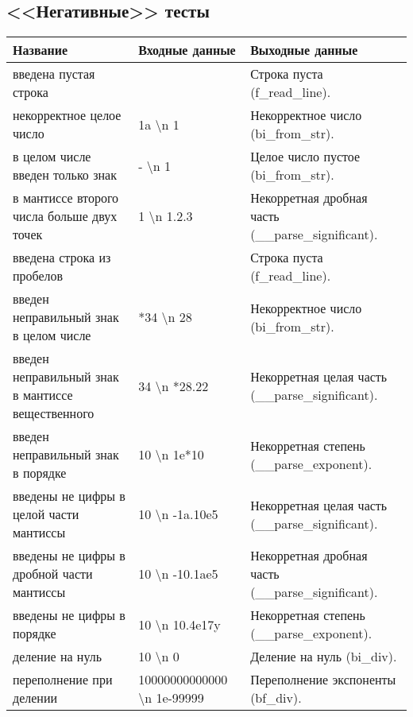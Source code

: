 \documentclass[a4paper,12pt]{extarticle}
\begin{document}
\subsection{<<Негативные>> тесты}
\begin{tabular}{ |p{4cm}|p{5cm}|p{5cm}| }
\hline
\textbf{Название} & \textbf{Входные данные} & \textbf{Выходные данные} \\ \hline
введена пустая строка &  & Строка пуста (f\_read\_line). \\ \hline
некорректное целое число & 1a \textbackslash n 1 & Некорректное число (bi\_from\_str). \\ \hline
в целом числе введен только знак & - \textbackslash n 1 & Целое число пустое (bi\_from\_str). \\ 
\hline
в мантиссе второго числа больше двух точек & 1 \textbackslash n 1.2.3 & Некорретная дробная часть (\_\_parse\_significant). \\
\hline
введена строка из пробелов &      & Строка пуста (f\_read\_line). \\ \hline
введен неправильный знак в целом числе & *34 \textbackslash n 28 & Некорректное число (bi\_from\_str). \\ \hline
введен неправильный знак в мантиссе вещественного & 34 \textbackslash n *28.22 & Некорретная целая часть (\_\_parse\_significant). \\ \hline
введен неправильный знак в порядке & 10 \textbackslash n 1e*10 & Некорретная степень (\_\_parse\_exponent). \\ \hline
введены не цифры в целой части мантиссы & 10 \textbackslash n -1a.10e5 & Некорретная целая часть (\_\_parse\_significant). \\ \hline
введены не цифры в дробной части мантиссы & 10 \textbackslash n -10.1ae5 & Некорретная дробная часть (\_\_parse\_significant). \\ \hline
введены не цифры в порядке & 10 \textbackslash n 10.4e17y & Некорретная степень (\_\_parse\_exponent). \\ \hline
деление на нуль & 10 \textbackslash n 0 & Деление на нуль (bi\_div). \\ \hline
переполнение при делении & 10000000000000 \textbackslash n 1e-99999 & Переполнение экспоненты (bf\_div). \\ \hline
\end{tabular}
\end{document}
